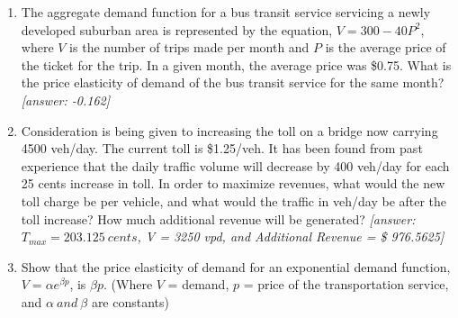 \begin{enumerate}
	\item The aggregate demand function for a bus transit service servicing a newly developed suburban area is represented by the equation, $ V = 300 - 40 P^2 $, where $ V $ is the number of trips made per month and $ P $ is the average price of the ticket for the trip. In a given month, the average price was \$0.75. What is the price elasticity of demand of the bus transit service for the same month? \textit{[answer: -0.162]}
	\item Consideration is being given to increasing the toll on a bridge now carrying 4500 veh/day. The current toll is \$1.25/veh. It has been found from past experience that the daily traffic volume will decrease by 400 veh/day for each 25 cents increase in toll. In order to maximize revenues, what would the new toll charge be per vehicle, and what would the traffic in veh/day be after the toll increase? How much additional revenue will  be generated? \textit{[answer: $ T_{max} = 203.125 \: cents $, V = 3250 vpd, and Additional Revenue = \$ 976.5625]}
	\item Show that the price elasticity of demand for an exponential demand function, $ V = \alpha e^{\beta p} $, is $ \beta p $. (Where $ V $ = demand, $ p $ = price of the transportation service, and $ \alpha \: and \: \beta $ are constants)
\end{enumerate}


